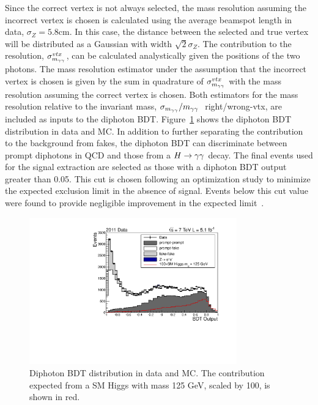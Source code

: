 Since the correct vertex is not always selected, the mass resolution assuming the incorrect vertex is chosen
is calculated using the average beamspot length in data, $\sigma_{Z}=5.8$cm. In this case, the distance 
between the selected and true vertex will be distributed as a Gaussian with width $\sqrt{2}\sigma_{Z}$.
The contribution to the resolution, $\sigma_{m_{\gamma\gamma}}^{vtx}$, can be calculated analystically given the positions of
the two photons. The mass resolution estimator under the assumption that the incorrect vertex is chosen is 
given by the sum in quadrature of $\sigma_{m_{\gamma\gamma}}^{vtx}$ with the mass resolution assuming the correct vertex is chosen.
Both estimators for the mass resolution relative to the invariant mass, $\sigma_{m_{\gamma\gamma}}/m_{\gamma\gamma}~$ right/wrong-vtx, 
are included as inputs to the diphoton BDT. Figure~\ref{fig:diphotonBDT} shows the diphoton BDT distribution in 
data and MC. In addition to further separating the contribution to the background from fakes, the diphoton BDT 
can discriminate between prompt diphotons in QCD and those from a $H\rightarrow\gamma\gamma$ decay. The final events used for 
the signal extraction are selected as those with a diphoton BDT output greater than 0.05. This cut is chosen
following an optimization study to minimize the expected exclusion limit in the absence of signal.
Events below this cut value were found to provide negligible improvement in the expected limit~\citep{AN-12-048}.

\begin{figure}[hbt!]
\begin{center}
 \includegraphics[width=0.8\textwidth]{hgg7TeV/variablePlots/bdtoutput}
 \caption{Diphoton BDT distribution in data and MC. The contribution expected from a SM Higgs with mass 125 GeV, 
 scaled by 100, is shown in red. }
 \label{fig:diphotonBDT}
\end{center}
\end{figure}

